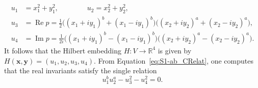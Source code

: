 \documentclass[twoside]{amsart}
\theoremstyle{definition}
\theoremstyle{remark}
\numberwithin{equation}{section}
\newcommand{\R}{\mathbb{R}}
\newcommand{\Real}{\operatorname{Re}}
\newcommand{\Imaginary}{\operatorname{Im}}
\begin{document}
\begin{equation}
\label{eq:S1-ab_RInvars}
\begin{aligned}
    u_1 &=      x_1^2 + y_1^2,
    \qquad\qquad
    u_2 =       x_2^2 + y_2^2,
    \\
    u_3 &=      \Real p
        =       \frac{1}{2}\big( (x_1 + i y_1)^b + (x_1 - i y_1)^b \big)\big( (x_2 + i y_2)^a + (x_2 - i y_2)^a \big),
    \\
    u_4 &=      \Imaginary p
        =       \frac{1}{2i}\big( (x_1 + i y_1)^b - (x_1 - i y_1)^b \big)\big( (x_2 + i y_2)^a - (x_2 - i y_2)^a \big).
\end{aligned}
\end{equation}
It follows that the Hilbert embedding $H\colon V\to\R^4$ is given by
$H(\mathbf{x}, \mathbf{y}) = (u_1, u_2, u_3, u_4)$. From Equation~\eqref{eq:S1-ab_CRelat}, one computes that the real invariants satisfy the single relation
\begin{equation}
\label{eq:S1-ab_RRelat}
    u_1^b u_2^a - u_3^2 - u_4^2 = 0.
\end{equation}
\end{document}
